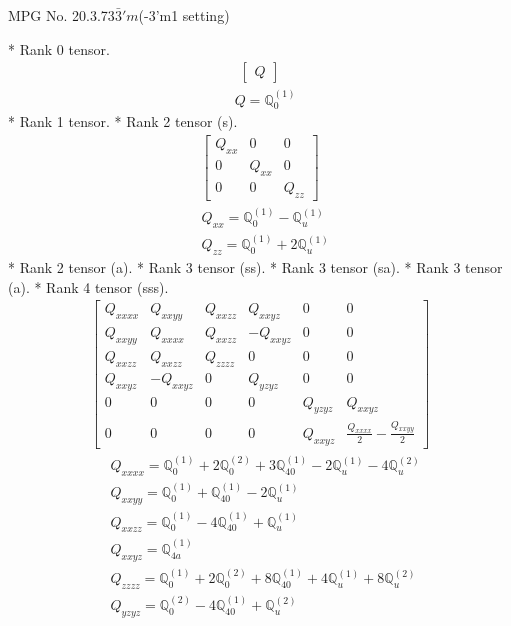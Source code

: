 \documentclass[fleqn,8pt,landscape]{jsarticle}
\begin{document}
\setcounter{MaxMatrixCols}{32}

\renewcommand{\tablename}{Table~}
\renewcommand{\figurename}{Figure~}
\begin{center}
\LARGE
MPG No. 20.3.73\quad$\bar{3}'m$\quad(-3'm1 setting)
\end{center}
* Rank 0 tensor.
\begin{align*}
\begin{bmatrix} Q \end{bmatrix}
\end{align*}
\begin{align*}
& Q = \mathbb{Q}_{0}^{(1)}
\end{align*}
* Rank 1 tensor.
* Rank 2 tensor (s).
\begin{align*}
\begin{bmatrix} Q_{xx} & 0 & 0 \\ 0 & Q_{xx} & 0 \\ 0 & 0 & Q_{zz} \end{bmatrix}
\end{align*}
\begin{align*}
& Q_{xx} = \mathbb{Q}_{0}^{(1)} - \mathbb{Q}_{u}^{(1)} \\
& Q_{zz} = \mathbb{Q}_{0}^{(1)} + 2 \mathbb{Q}_{u}^{(1)}
\end{align*}
* Rank 2 tensor (a).
* Rank 3 tensor (ss).
* Rank 3 tensor (sa).
* Rank 3 tensor (a).
* Rank 4 tensor (sss).
\begin{align*}
\begin{bmatrix} Q_{xxxx} & Q_{xxyy} & Q_{xxzz} & Q_{xxyz} & 0 & 0 \\ Q_{xxyy} & Q_{xxxx} & Q_{xxzz} & - Q_{xxyz} & 0 & 0 \\ Q_{xxzz} & Q_{xxzz} & Q_{zzzz} & 0 & 0 & 0 \\ Q_{xxyz} & - Q_{xxyz} & 0 & Q_{yzyz} & 0 & 0 \\ 0 & 0 & 0 & 0 & Q_{yzyz} & Q_{xxyz} \\ 0 & 0 & 0 & 0 & Q_{xxyz} & \frac{Q_{xxxx}}{2} - \frac{Q_{xxyy}}{2} \end{bmatrix}
\end{align*}
\begin{align*}
& Q_{xxxx} = \mathbb{Q}_{0}^{(1)} + 2 \mathbb{Q}_{0}^{(2)} + 3 \mathbb{Q}_{40}^{(1)} - 2 \mathbb{Q}_{u}^{(1)} - 4 \mathbb{Q}_{u}^{(2)} \\
& Q_{xxyy} = \mathbb{Q}_{0}^{(1)} + \mathbb{Q}_{40}^{(1)} - 2 \mathbb{Q}_{u}^{(1)} \\
& Q_{xxzz} = \mathbb{Q}_{0}^{(1)} - 4 \mathbb{Q}_{40}^{(1)} + \mathbb{Q}_{u}^{(1)} \\
& Q_{xxyz} = \mathbb{Q}_{4a}^{(1)} \\
& Q_{zzzz} = \mathbb{Q}_{0}^{(1)} + 2 \mathbb{Q}_{0}^{(2)} + 8 \mathbb{Q}_{40}^{(1)} + 4 \mathbb{Q}_{u}^{(1)} + 8 \mathbb{Q}_{u}^{(2)} \\
& Q_{yzyz} = \mathbb{Q}_{0}^{(2)} - 4 \mathbb{Q}_{40}^{(1)} + \mathbb{Q}_{u}^{(2)}
\end{align*}
\end{document}

